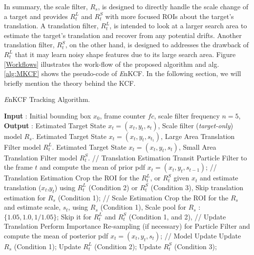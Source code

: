 \documentclass{bmvc2k}
\begin{document}
In summary, the scale filter, $R_{s}$, is designed to directly handle
the scale change of a target and provides $R_{t}^{L}$ and $R_{t}^{S}$
with more focused ROIs about the target's translation. A translation
filter, $R_{t}^{L}$, is intended to look at a larger search area to
estimate the target's translation and recover from any potential
drifts. Another translation filter, $R_{t}^{S}$, on the other hand, is
designed to addresses the drawback of $R_{t}^{L}$ that it may learn
noisy shape features due to its large search area. Figure
\ref{Workflows} illustrates the work-flow of the proposed algorithm
and alg.\ref{alg:MKCF} shows the pseudo-code of {\it E}nKCF. In the
following section, we will briefly mention the theory behind the KCF.
\begin{algorithm}[h]
\small
	\caption{{\it E}nKCF Tracking Algorithm.}\label{alg:MKCF}
	\begin{algorithmic}[1]
	\State \textbf{Input} : Initial bounding box $x_{0}$, frame counter $fc$, scale filter frequency $n = 5$,
	\State \textbf{Output} : 
				 
						\State Estimated Target State $x_{t} = (x_{t},y_{t},s_{t})$,
						Scale filter (\textit{target-only}) model $R_{s}$.
			     \EndIf
						\State Estimated Target State $x_{t} = (x_{t},y_{t},s_{t_1})$,
						Large Area Translation Filter model $R_{t}^{L}$.
				\EndIf
						\State Estimated Target State $x_{t} = (x_{t},y_{t},s_{t})$,
						Small Area Translation Filter model $R_{t}^{S}$.
				\EndIf
				\State // Translation Estimation
				\State Transit Particle Filter to the frame $t$ and compute the mean of prior pdf $x_{t} = (x_{t},y_{t},s_{t-1})$;
				\State // Translation Estimation
				\State Crop the ROI for the $R_{t}^{L}$, or $R_{t}^{S}$ given $x_{t}$
				and estimate translation ($x_{t}$,$y_{t}$) using $R_{t}^{L}$ (Condition 2) or $R_{t}^{S}$ (Condition 3),
				\State Skip translation estimation for $R_{s}$ (Condition 1);
				\State // Scale Estimation
			    \State Crop the ROI for the $R_{s}$ and estimate scale, $s_{t}$, using $R_{s}$ (Condition 1), 
				\State Scale pool for $R_{s}$ : $\lbrace1.05,1.0,1/1.05\rbrace$;
		        \State Skip it for $R_{t}^{L}$ and $R_{t}^{S}$ (Condition 1, and 2),
				\State // Update Translation
				\State Perform Importance Re-sampling (if necessary) for Particle Filter and compute the mean of posterior pdf $x_{t} = (x_{t},y_{t},s_{t})$;
			    \State // Model Update
			    \State Update $R_{s}$ (Condition 1);
			    \State Update $R_{t}^{L}$ (Condition 2);
				\State Update $R_{t}^{S}$ (Condition 3);
			     \EndIf		
	\EndProcedure	
	\end{algorithmic}
\end{algorithm}
\end{document}

